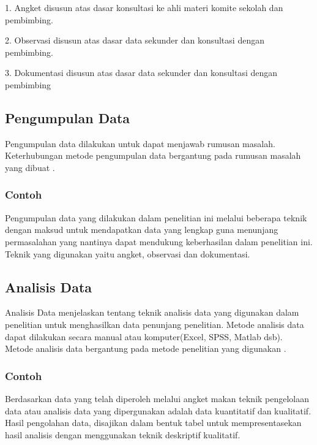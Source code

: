 \documentclass[10pt]{IEEEtran}
\begin{document}
1. Angket disusun atas dasar konsultasi ke ahli materi komite sekolah dan
pembimbing.

2. Observasi disusun atas dasar data sekunder dan konsultasi dengan
pembimbing.

3. Dokumentasi disusun atas dasar data sekunder dan konsultasi dengan
pembimbing

\subsection{Pengumpulan Data}Pengumpulan data dilakukan untuk dapat menjawab rumusan masalah. Keterhubungan metode pengumpulan data bergantung pada rumusan masalah yang dibuat \cite{youtube:1}.
\subsubsection*{Contoh}
Pengumpulan data yang dilakukan dalam penelitian ini melalui beberapa
teknik dengan maksud untuk mendapatkan data yang lengkap guna
menunjang permasalahan yang nantinya dapat mendukung keberhasilan
dalam penelitian ini. Teknik yang digunakan yaitu angket, observasi dan
dokumentasi\cite{unila:2}.

\subsection{Analisis Data}
Analisis Data menjelaskan tentang teknik analisis data yang digunakan dalam penelitian untuk menghasilkan data penunjang penelitian. Metode analisis data dapat dilakukan secara manual atau komputer(Excel, SPSS,  Matlab dsb). Metode analisis data bergantung pada metode penelitian yang digunakan \cite{youtube:1}.

\subsubsection*{Contoh}Berdasarkan data yang telah diperoleh melalui angket makan teknik
pengelolaan data atau analisis data yang dipergunakan adalah data kuantitatif
dan kualitatif. Hasil pengolahan data, disajikan dalam bentuk tabel untuk
mempresentasekan hasil analisis dengan menggunakan teknik deskriptif
kualitatif\cite{unila:2}.

\newpage

\printbibliography
\end{document}
